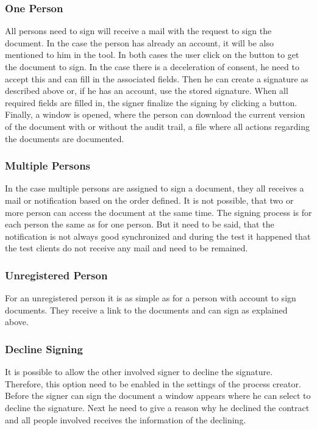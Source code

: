 \subsubsection{One Person}
All persons need to sign will receive a mail with the request to sign the document. In the case the person has already an account, it will be also mentioned to him in the tool. In both cases the user click on the button to get the document to sign. In the case there is a deceleration of consent, he need to accept this and can fill in the associated fields. Then he can create a signature as described above or, if he has an account, use the stored signature. When all required fields are filled in, the signer finalize the signing by clicking a button. Finally, a window is opened, where the person can download the current version of the document with or without the audit trail, a file where all actions regarding the documents are documented. 

\subsubsection{Multiple Persons}
In the case multiple persons are assigned to sign a document, they all receives a mail or notification based on the order defined. It is not possible, that two or more person can access the document at the same time. The signing process is for each person the same as for one person. But it need to be said, that the notification is not always good synchronized and during the test it happened that the test clients do not receive any mail and need to be remained.

\subsubsection{Unregistered Person}
For an unregistered person it is as simple as for a person with account to sign documents. They receive a link to the documents and can sign as explained above. 

\subsubsection{Decline Signing}
It is possible to allow the other involved signer to decline the signature. Therefore, this option need to be enabled in the settings of the process creator. Before the signer can sign the document a window appears where he can select to decline the signature. Next he need to give a reason why he declined the contract and all people involved receives the information of the declining.

